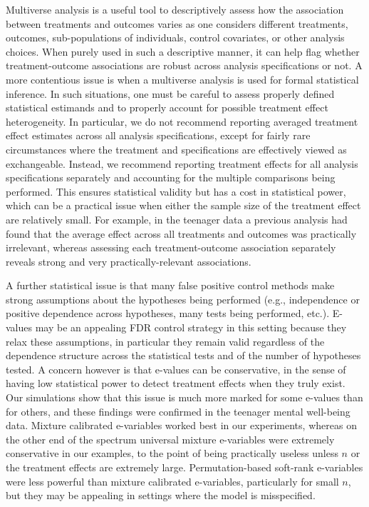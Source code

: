 \documentclass[pdflatex,sn-mathphys-num]{sn-jnl}%
\theoremstyle{thmstyleone}%
\theoremstyle{thmstyletwo}%
\theoremstyle{thmstylethree}%
\begin{document}
Multiverse analysis is a useful tool to descriptively assess how the association between treatments and outcomes varies as one considers different treatments, outcomes, sub-populations of individuals, control covariates, or other analysis choices. When purely used in such a descriptive manner, it can help flag whether treatment-outcome associations are robust across analysis specifications or not.
A more contentious issue is when a multiverse analysis is used for formal statistical inference. In such situations, one must be careful to assess properly defined statistical estimands and to properly account for possible treatment effect heterogeneity. In particular, we do not recommend reporting averaged treatment effect estimates across all analysis specifications, except for fairly rare circumstances where the treatment and specifications are effectively viewed as exchangeable.
Instead, we recommend reporting treatment effects for all analysis specifications separately and accounting for the multiple comparisons being performed. This ensures statistical validity but has a cost in statistical power, which can be a practical issue when either the sample size of the treatment effect are relatively small.
For example, in the teenager data a previous analysis had found that the average effect across all treatments and outcomes was practically irrelevant, whereas assessing each treatment-outcome association separately reveals strong and very practically-relevant associations.

A further statistical issue is that many false positive control methods make strong assumptions about the hypotheses being performed (e.g., independence or positive dependence across hypotheses, many tests being performed, etc.). E-values may be an appealing FDR control strategy in this setting because they relax these assumptions, in particular they remain valid regardless of the dependence structure across the statistical tests and of the number of hypotheses tested. A concern however is that e-values can be conservative, in the sense of having low statistical power to detect treatment effects when they truly exist. Our simulations show that this issue is much more marked for some e-values than for others, and these findings were confirmed in the teenager mental well-being data. Mixture calibrated e-variables worked best in our experiments, whereas on the other end of the spectrum universal mixture e-variables were extremely conservative in our examples, to the point of being practically useless unless $n$ or the treatment effects are extremely large. Permutation-based soft-rank e-variables were less powerful than mixture calibrated e-variables, particularly for small $n$, but they may be appealing in settings where the model is misspecified.
\end{document}
